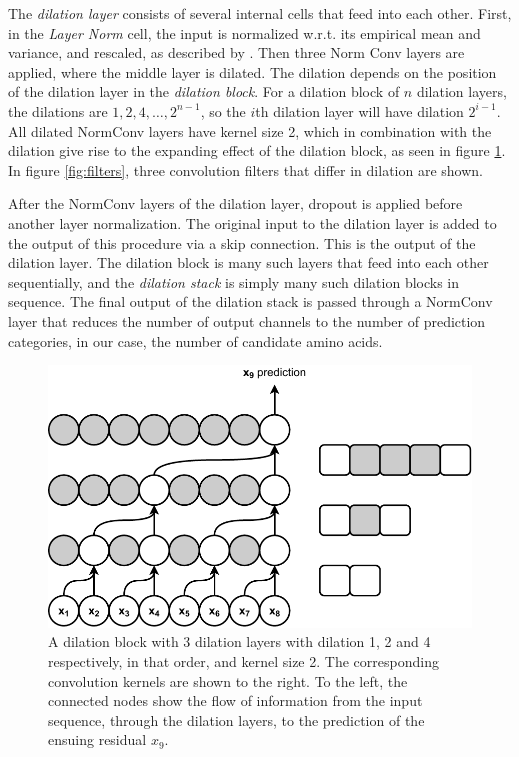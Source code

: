 The \textit{dilation layer} consists of several internal cells that feed into each other. First, in the \textit{Layer Norm} cell, the input is normalized w.r.t. its empirical mean and variance, and rescaled, as described by \textcite{ba2016layer}. Then three Norm Conv layers are applied, where the middle layer is dilated. The dilation depends on the position of the dilation layer in the \textit{dilation block}. For a dilation block of $n$ dilation layers, the dilations are $1, 2, 4, \ldots, 2^{n - 1}$, so the $i$th dilation layer will have dilation $2^{i - 1}$. All dilated NormConv layers have kernel size 2, which in combination with the dilation give rise to the expanding effect of the dilation block, as seen in figure \ref{fig:dilation_layers}. In figure \ref{fig:filters}, three convolution filters that differ in dilation are shown. 

After the NormConv layers of the dilation layer, dropout is applied before another layer normalization. The original input to the dilation layer is added to the output of this procedure via a skip connection. This is the output of the dilation layer. The dilation block is many such layers that feed into each other sequentially, and the \textit{dilation stack} is simply many such dilation blocks in sequence. The final output of the dilation stack is passed through a NormConv layer that reduces the number of output channels to the number of prediction categories, in our case, the number of candidate amino acids.

\begin{figure}[H]
    \centering
    \includegraphics{report/figures/wavenet.pdf}
    \caption{A dilation block with 3 dilation layers with dilation 1, 2 and 4 respectively, in that order, and kernel size 2. The corresponding convolution kernels are shown to the right. To the left, the connected nodes show the flow of information from the input sequence, through the dilation layers, to the prediction of the ensuing residual $x_9$.}
    \label{fig:dilation_layers}
\end{figure}

